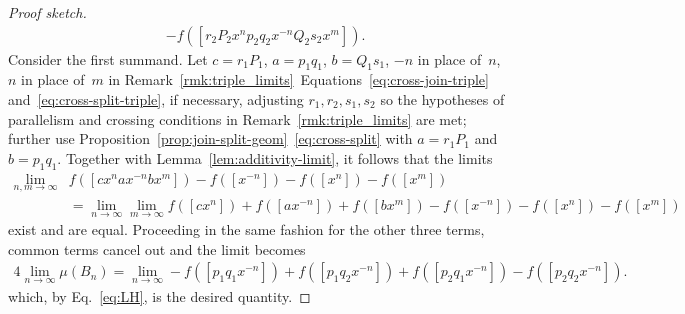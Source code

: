 \begin{proof}[Proof sketch]
\begin{equation}
\begin{aligned}
& -f([r_2P_2x^{n}p_2 q_2x^{-n}Q_2s_2x^m]).
\end{aligned}
\end{equation}
Consider the first summand.
Let $c=r_1P_1$, $a=p_1q_1$, $b=Q_1s_1$, $-n$ in place of~$n$, $n$ in
place of~$m$ in
Remark~\ref{rmk:triple_limits}~Equations~\eqref{eq:cross-join-triple}
and~\eqref{eq:cross-split-triple}, if necessary, adjusting
$r_1,r_2,s_1,s_2$ so the hypotheses of parallelism and crossing
conditions in Remark~\ref{rmk:triple_limits} are met; further use
Proposition~\ref{prop:join-split-geom}~\eqref{eq:cross-split} with
$a=r_1P_1$ and $b=p_1 q_1$. Together with
Lemma~\ref{lem:additivity-limit},
it follows that the limits
\begin{equation}
\begin{aligned}
\lim_{n,m\to \infty} &f([cx^{n}ax^{-n}bx^m])-f([x^{-n}])-f([x^{n}])-f([x^m]) \\
&= \lim_{n\to \infty}  \lim_{m\to \infty}f([cx^{n}])+f([ax^{-n}])+f([bx^m])-f([x^{-n}])-f([x^{n}])-f([x^m])
\end{aligned}
\end{equation}
exist and are equal.
Proceeding in the same fashion for the other three terms, common terms cancel out and the limit becomes
\begin{equation}
\begin{aligned}
4\lim_{n \to \infty} \mu(B_n) =
\lim_{n \to \infty} -f([p_1 q_1x^{-n}])
 +f([p_1 q_2x^{-n}])
 +f([p_2 q_1x^{-n}])
 -f([p_2 q_2x^{-n}]).
\end{aligned}
\end{equation}
which, by Eq.~\eqref{eq:LH}, is the desired quantity.
\end{proof}

